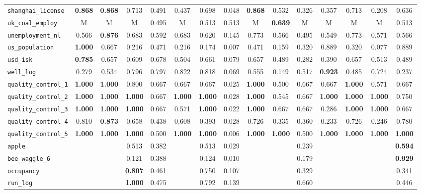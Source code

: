 \begin{tabular}{lcccccccccccccc}
\verb+shanghai_license+ & \textbf{0.868} & \textbf{0.868} & 0.713 & 0.491 & 0.437 & 0.698 & 0.048 & \textbf{0.868} & 0.532 & 0.326 & 0.357 & 0.713 & 0.208 & 0.636\\
\verb+uk_coal_employ+ & M & M & M & 0.495 & M & 0.513 & 0.513 & M & \textbf{0.639} & M & M & M & M & 0.513\\
\verb+unemployment_nl+ & 0.566 & \textbf{0.876} & 0.683 & 0.592 & 0.683 & 0.620 & 0.145 & 0.773 & 0.566 & 0.495 & 0.549 & 0.773 & 0.571 & 0.566\\
\verb+us_population+ & \textbf{1.000} & 0.667 & 0.216 & 0.471 & 0.216 & 0.174 & 0.007 & 0.471 & 0.159 & 0.320 & 0.889 & 0.320 & 0.077 & 0.889\\
\verb+usd_isk+ & \textbf{0.785} & 0.657 & 0.609 & 0.678 & 0.504 & 0.661 & 0.079 & 0.657 & 0.489 & 0.282 & 0.390 & 0.657 & 0.513 & 0.489\\
\verb+well_log+ & 0.279 & 0.534 & 0.796 & 0.797 & 0.822 & 0.818 & 0.069 & 0.555 & 0.149 & 0.517 & \textbf{0.923} & 0.485 & 0.724 & 0.237\\
\midrule
\verb+quality_control_1+ & \textbf{1.000} & \textbf{1.000} & 0.800 & 0.667 & 0.667 & 0.667 & 0.025 & \textbf{1.000} & 0.500 & 0.667 & 0.667 & \textbf{1.000} & 0.571 & 0.667\\
\verb+quality_control_2+ & \textbf{1.000} & \textbf{1.000} & \textbf{1.000} & 0.667 & \textbf{1.000} & \textbf{1.000} & 0.028 & \textbf{1.000} & 0.545 & 0.667 & \textbf{1.000} & \textbf{1.000} & \textbf{1.000} & 0.750\\
\verb+quality_control_3+ & \textbf{1.000} & \textbf{1.000} & \textbf{1.000} & 0.667 & 0.571 & \textbf{1.000} & 0.022 & \textbf{1.000} & 0.667 & 0.667 & 0.286 & \textbf{1.000} & \textbf{1.000} & 0.667\\
\verb+quality_control_4+ & 0.810 & \textbf{0.873} & 0.658 & 0.438 & 0.608 & 0.393 & 0.028 & 0.726 & 0.335 & 0.360 & 0.233 & 0.726 & 0.246 & 0.780\\
\verb+quality_control_5+ & \textbf{1.000} & \textbf{1.000} & \textbf{1.000} & 0.500 & \textbf{1.000} & \textbf{1.000} & 0.006 & \textbf{1.000} & \textbf{1.000} & 0.500 & \textbf{1.000} & \textbf{1.000} & \textbf{1.000} & \textbf{1.000}\\
\midrule
\verb+apple+ &  &  & 0.513 & 0.382 &  & 0.513 & 0.029 &  &  & 0.239 &  &  &  & \textbf{0.594}\\
\verb+bee_waggle_6+ &  &  & 0.121 & 0.388 &  & 0.124 & 0.010 &  &  & 0.179 &  &  &  & \textbf{0.929}\\
\verb+occupancy+ &  &  & \textbf{0.807} & 0.461 &  & 0.750 & 0.107 &  &  & 0.329 &  &  &  & 0.341\\
\verb+run_log+ &  &  & \textbf{1.000} & 0.475 &  & 0.792 & 0.139 &  &  & 0.660 &  &  &  & 0.446\\
\bottomrule
\end{tabular}
